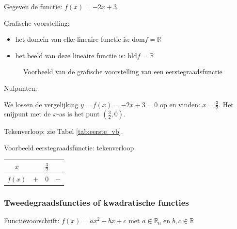 \begin{voorbeeld}
	Gegeven de functie: $f(x)=-2x+3$.
	

Grafische voorstelling:
\begin{itemize}
\item het domein van elke lineaire functie is: $\textrm{dom}f=\mathbb{R}$
\item het beeld van deze lineaire functie is: $\textrm{bld}f=\mathbb{R}$
\end{itemize}


\begin{figure}[h]
	\centering          
	
	\caption{Voorbeeld van de grafische voorstelling van een eerstegraadsfunctie}
	\label{fig:eerstegraadsfunctie_3}	
\end{figure}



Nulpunten:

We lossen de vergelijking $y=f(x)=-2x+3=0$ op en vinden:
$x=\frac{3}{2}$. Het snijpunt met de $x$-as is het punt $(\frac{3}{2},0)$.

Tekenverloop: zie Tabel \ref{tab:eerste_vb}.

\begin{tabel}{Voorbeeld eerstegraadsfunctie: tekenverloop}
\begin{tabular}{c||c|c|c}
	$x$ &  & $\frac{3}{2}$ & \\
	\hline 
	$f(x)$ & $+$ & 0 & $-$\\
\end{tabular}
\label{tab:eerste_vb}	
\end{tabel}

\end{voorbeeld}

\subsubsection{Tweedegraadsfuncties of kwadratische functies}



\begin{definitie}
	Functievoorschrift: $f(x)=ax^{2}+bx+c$ met $a\in\mathbb{R}_{0}$
en $b,c\in\mathbb{R}$ 

\end{definitie}

